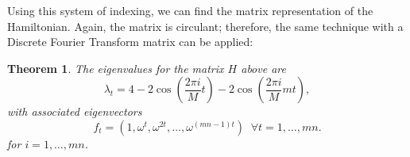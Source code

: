 \documentclass{article}
\newtheorem{theorem}{Theorem}
\numberwithin{equation}{section}
\numberwithin{theorem}{section}
\numberwithin{proposition}{section}
\numberwithin{lemma}{section}
\numberwithin{corollary}{section}
\numberwithin{definition}{section}
\begin{document}
Using this system of indexing, we can find the matrix representation of the Hamiltonian. Again, the matrix is circulant; therefore, the same technique with a Discrete Fourier Transform matrix can be applied:
\newpage
\begin{theorem}
	The eigenvalues for the matrix $H$ above are
	\begin{equation}
	\lambda_t = 4 -2\cos\left(\frac{2\pi i}{M} t\right) -2\cos\left(\frac{2\pi i}{M} mt\right),
	\end{equation}
	with associated eigenvectors
	\begin{equation}
	{f}_t = (1, \omega^t, \omega^{2t}, \ldots, \omega^{(mn-1)t}) \; \; \forall t = 1, \ldots, mn.
	\end{equation}
	for $i = 1, \ldots, mn$.
\end{theorem}
\end{document}
